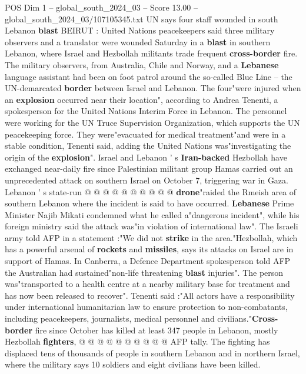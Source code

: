 \begin{textsample}{POS Dim 1 – global\_south\_2024\_03 – Score 13.00 – global\_south\_2024\_03/107105345.txt}  \label{ex:f1_pos_347}
UN says four staff wounded in south Lebanon \textbf{blast} BEIRUT : United Nations peacekeepers said three military observers and a translator were wounded Saturday in a \textbf{blast} in southern Lebanon, where Israel and Hezbollah militants trade frequent \textbf{cross-border} fire.
The military observers, from Australia, Chile and Norway, and a \textbf{Lebanese} language assistant had been on foot patrol around the so-called Blue Line -- the UN-demarcated \textbf{border} between Israel and Lebanon.
The four"were injured when an \textbf{explosion} occurred near their location", according to Andrea Tenenti, a spokesperson for the United Nations Interim Force in Lebanon.
The personnel were working for the UN Truce Supervision Organization, which supports the UN peacekeeping force.
They were"evacuated for medical treatment"and were in a stable condition, Tenenti said, adding the United Nations was"investigating the origin of the \textbf{explosion}".
Israel and Lebanon ' s \textbf{Iran-backed} Hezbollah have exchanged near-daily fire since Palestinian militant group Hamas carried out an unprecedented attack on southern Israel on October 7, triggering war in Gaza.
Lebanon ' s state-run @ @ @ @ @ @ @ @ @ @ \textbf{drone}"raided the Rmeish area of southern Lebanon where the incident is said to have occurred. \textbf{Lebanese} Prime Minister Najib Mikati condemned what he called a"dangerous incident", while his foreign ministry said the attack was"in violation of international law".
The Israeli army told AFP in a statement :"We did not \textbf{strike} in the area."Hezbollah, which has a powerful arsenal of \textbf{rockets} and \textbf{missiles}, says its attacks on Israel are in support of Hamas.
In Canberra, a Defence Department spokesperson told AFP the Australian had sustained"non-life threatening \textbf{blast} injuries".
The person was"transported to a health centre at a nearby military base for treatment and has now been released to recover".
Tenenti said :"All actors have a responsibility under international humanitarian law to ensure protection to non-combatants, including peacekeepers, journalists, medical personnel and civilians."\textbf{Cross-border} fire since October has killed at least 347 people in Lebanon, mostly Hezbollah \textbf{fighters}, @ @ @ @ @ @ @ @ @ @ AFP tally.
The fighting has displaced tens of thousands of people in southern Lebanon and in northern Israel, where the military says 10 soldiers and eight civilians have been killed.

\end{textsample}
